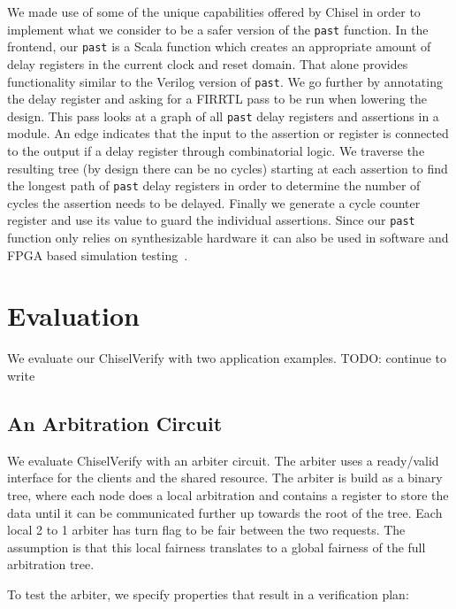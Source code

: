 \documentclass[conference]{IEEEtran}
\newcommand\scalainline[1]{\texttt{#1}}
\newcommand{\todo}[1]{{\color{olive} TODO: #1}}
\begin{document}
We made use of some of the unique capabilities offered by Chisel in order to implement what we consider to be a safer version of the
\scalainline{past} function.
In the frontend, our \scalainline{past} is a Scala function which creates an appropriate amount of delay registers in the current
clock and reset domain. That alone provides functionality similar to the Verilog version of \scalainline{past}.
We go further by annotating the delay register and asking for a FIRRTL pass to be run when lowering the design.
This pass looks at a graph of all \scalainline{past} delay registers and assertions in a module.
An edge indicates that the input to the assertion or register is connected to the output if a delay register through combinatorial logic.
We traverse the resulting tree (by design there can be no cycles) starting at each assertion
to find the longest path of \scalainline{past} delay registers in order to determine the number of cycles the assertion needs to be delayed.
Finally we generate a cycle counter register and use its value to guard the individual assertions.
Since our \scalainline{past} function only relies on synthesizable hardware it can also be used in software and FPGA based
simulation testing~\cite{karandikar2018firesim}.






\section{Evaluation}

We evaluate our ChiselVerify with two application examples. \todo{continue to write}

\subsection{An Arbitration Circuit}

We evaluate ChiselVerify with an arbiter circuit. The arbiter uses a ready/valid interface for the clients
and the shared resource. The arbiter is build as a binary tree, where each node does a local arbitration
and contains a register to store the data until it can be communicated further up towards the root of the
tree. Each local 2 to 1 arbiter has turn flag to be fair between the two requests. The assumption is that
this local fairness translates to a global fairness of the full arbitration tree.

To test the arbiter, we specify properties that result in a verification plan:
\end{document}
